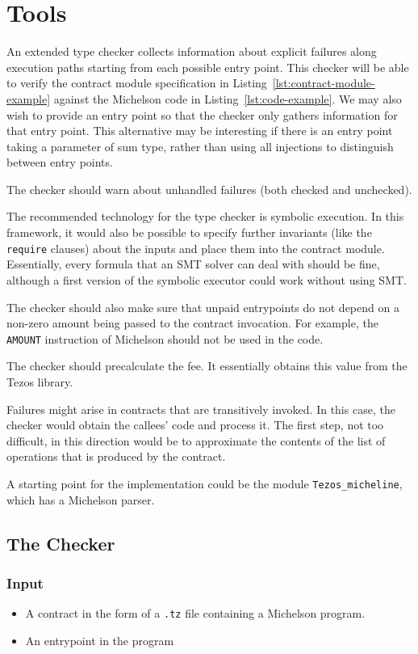 \documentclass[a4paper]{llncs}
\begin{document}
\clearpage
\section{Tools}
\label{sec:tools}

An extended type checker collects information about explicit failures
along execution paths starting from each possible entry point. This
checker will be able to verify the contract module specification in
Listing~\ref{lst:contract-module-example} against the Michelson code
in Listing~\ref{lst:code-example}. We may also wish to provide an
entry point so that the checker only gathers information for that
entry point. This alternative may be interesting if there is an entry
point taking a parameter of sum type, rather than using all injections
to distinguish between entry points.

The checker should warn about unhandled failures (both checked and unchecked).

The recommended technology for the type checker is symbolic
execution. In this framework, it would also 
be possible to specify further invariants (like the
\lstinline/require/ clauses) about the inputs and place
them into the contract module. Essentially, every formula that an SMT
solver can deal with should be fine, although a first version of the
symbolic executor could work without using SMT.

The checker should also make sure that unpaid entrypoints do not
depend on a non-zero amount being passed to the contract
invocation. For example, the \texttt{AMOUNT} instruction of Michelson
should not be used in the code.  

The checker should precalculate the fee. It essentially obtains
this value from the Tezos library.

Failures might arise in contracts that are transitively invoked. In
this case, the checker would obtain the callees' code and process
it. The first step, not too difficult, in this direction would be to
approximate the contents of the list of operations that is produced by
the contract. 

A starting point for the implementation could be the module \lstinline/Tezos_micheline/, which has a
Michelson parser.

\subsection{The Checker}
\label{sec:checker}

\subsubsection{Input}
\begin{itemize}
\item A contract in the form of a \texttt{.tz} file containing a
  Michelson program.
\item An entrypoint in the program
\end{itemize}
\end{document}
